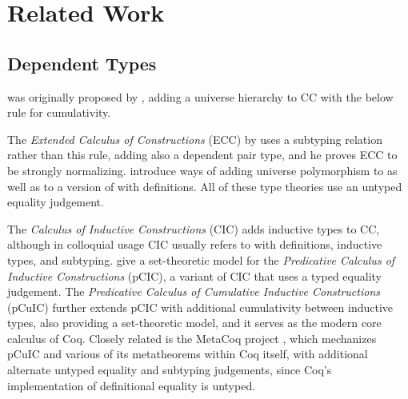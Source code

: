 \section{Related Work}

\TODO

\subsection{Dependent Types}

\GCC {}
was originally proposed by \citet{GCC-Coquand},
adding a universe hierarchy to CC with the below rule for cumulativity.

\vspace{-\baselineskip}
\begin{mathpar}
\end{mathpar}

The \emph{Extended Calculus of Constructions}
(ECC) by \citet{ECC} uses a subtyping relation rather than this rule,
adding also a dependent pair type,
and he proves ECC to be strongly normalizing.
\citet{universes} introduce ways of adding universe polymorphism to \GCC
as well as to a version of \GCC with definitions.
All of these type theories use an untyped equality judgement.

The \emph{Calculus of Inductive Constructions} (CIC) \citep{CIC}
adds inductive types to CC,
although in colloquial usage CIC usually refers to \GCC with definitions, inductive types, and subtyping.
\citet{pCIC} give a set-theoretic model for the \emph{Predicative Calculus of Inductive Constructions} (pCIC),
a variant of CIC that uses a typed equality judgement.
The \emph{Predicative Calculus of Cumulative Inductive Constructions}
 (pCuIC) \citep{pCuIC}
further extends pCIC with additional cumulativity between inductive types,
also providing a set-theoretic model,
and it serves as the modern core calculus of Coq.
Closely related is the MetaCoq project \citep{MetaCoq},
which mechanizes pCuIC and various of its metatheorems within Coq itself,
with additional alternate untyped equality and subtyping judgements,
since Coq's implementation of definitional equality is untyped.


